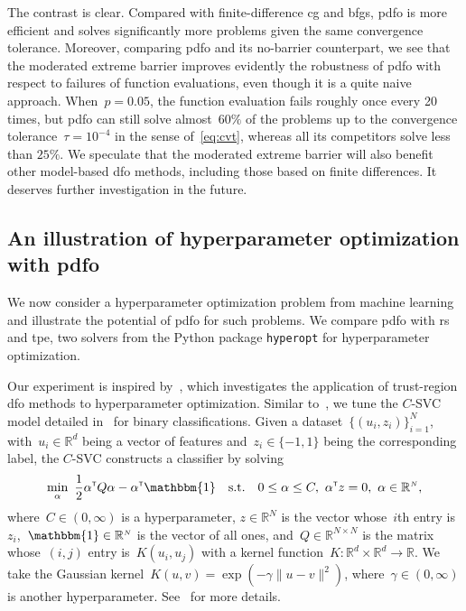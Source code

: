 \documentclass[manuscript,screen,review]{acmart}
\numberwithin{equation}{section}
\newcommand*{\R}{\mathbb{R}}
\newcommand*{\norm}[2][]{#1\lVert#2#1\rVert}
\newcommand*{\ones}{\mathbbm{1}}
\newcommand*{\sn}{{\scriptscriptstyle{N}}}
\newcommand*{\st}{\text{s.t.}}
\newcommand*{\trs}{{\scriptscriptstyle{\mathsf{T}}}}
\begin{document}
The contrast is clear.
Compared with finite-difference \gls{cg} and \gls{bfgs}, \gls{pdfo} is more efficient and solves significantly more problems given the same convergence tolerance.
Moreover, comparing \gls{pdfo} and its no-barrier counterpart, we see that the moderated extreme barrier improves evidently the robustness of \gls{pdfo} with respect to failures of function evaluations, even though it is a quite naive approach.
When~$p = 0.05$, the function evaluation fails roughly once every \num{20} times, but \gls{pdfo} can still solve almost~$60\%$ of the problems up to the convergence tolerance~$\tau = 10^{-4}$ in the sense of~\eqref{eq:cvt}, whereas all its competitors solve less than $25\%$.
We speculate that the moderated extreme barrier will also benefit other model-based \gls{dfo} methods, including those based on finite differences.
It deserves further investigation in the future.

\subsection{An illustration of hyperparameter optimization with \gls{pdfo}}
\label{subsec:hypertune}

We now consider a hyperparameter optimization problem from machine learning and illustrate the potential of \gls{pdfo} for such problems.
We compare \gls{pdfo} with \gls{rs} and \gls{tpe}, two solvers from the Python package \texttt{hyperopt} for hyperparameter optimization.

Our experiment is inspired by~\cite[\S~5.3]{Ghanbari_Scheinberg_2017}, which investigates the application of trust-region \gls{dfo} methods to hyperparameter optimization.
Similar to~\cite[\S~5.3]{Ghanbari_Scheinberg_2017}, we tune the $C$-SVC model detailed in~\cite[\S~2.1]{Chang_Lin_2011} for binary classifications.
Given a dataset~$\{(u_i,z_i)\}_{i=1}^\sn$, with~$u_i \in \R^d$ being a vector of features and~$z_i \in \{-1,1\}$ being the corresponding label, the $C$-SVC constructs a classifier by solving
\begin{equation}
    \label{eq:svc}
        \min_{\alpha} ~ \frac{1}{2} \alpha^\trs Q \alpha - \alpha^\trs \ones \quad \st \quad 0 \leq \alpha \leq C, ~ \alpha^\trs z = 0, ~ \alpha \in\R^{\sn},
\end{equation}
where~$C\in(0,\infty)$ is a hyperparameter, $z\in\R^{\sn}$ is the vector whose~$i$th entry is~$z_i$,~$\ones\in\R^\sn$ is the vector of all ones, and~$Q\in\R^{\sn\times \sn}$ is the matrix whose~$(i,j)$ entry is~$K(u_i,u_j)$ with a kernel function~$K\mathrel{:} \R^{d}\times\R^{d} \to \R$.
We take the Gaussian kernel~$K(u,v) = \exp(-\gamma\norm{u-v}^2)$, where~$\gamma \in (0,\infty)$ is another hyperparameter.
See~\cite[\S~2.1]{Chang_Lin_2011} for more details.
\end{document}
